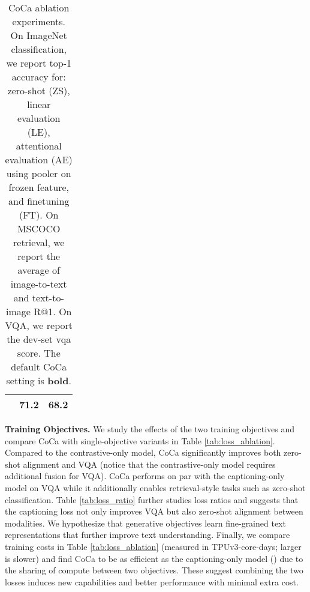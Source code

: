 \begin{table*}[t]
{\begin{minipage}{0.29\linewidth}
{\begin{center}
\begin{tabular}{lcc}
     & 71.2 & 68.2 \\
    \bottomrule
\end{tabular}
\end{center}}\end{minipage}
}
\vspace{-.1em}
\caption{CoCa ablation experiments. On ImageNet classification, we report top-1 accuracy for: zero-shot (ZS), linear evaluation (LE), attentional evaluation (AE) using pooler on frozen feature, and finetuning (FT). On MSCOCO retrieval, we report the average of image-to-text and text-to-image R@1. On VQA, we report the dev-set vqa score. The default CoCa setting is \textbf{bold}.}
\label{tab:ablations} \vspace{-.5em}
\end{table*}
 
\textbf{Training Objectives.}
We study the effects of the two training objectives and
compare CoCa with single-objective variants in Table \ref{tab:loss_ablation}.
Compared to the contrastive-only model,
CoCa significantly improves both zero-shot alignment and VQA (notice that the contrastive-only model requires additional fusion for VQA).
CoCa performs on par with the captioning-only model on VQA while it additionally enables retrieval-style tasks such as zero-shot classification.
Table \ref{tab:loss_ratio} further studies loss ratios and suggests that the captioning loss not only improves VQA but also zero-shot alignment between modalities.
We hypothesize that generative objectives learn fine-grained text representations that further improve text understanding.
Finally, we compare training costs in Table \ref{tab:loss_ablation} (measured in TPUv3-core-days; larger is slower) and find CoCa to be as efficient as the captioning-only model () due to the sharing of compute between two objectives.
These suggest combining the two losses induces new capabilities and better performance with minimal extra cost.

